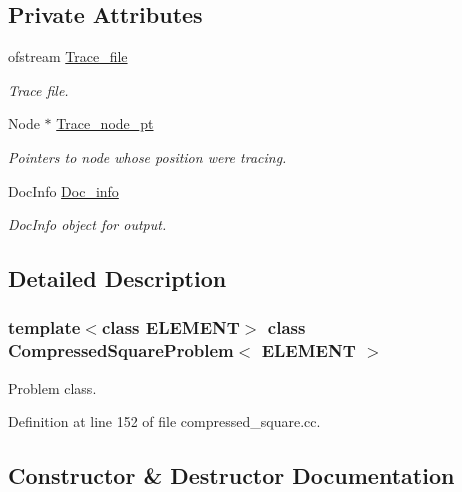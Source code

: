 \subsection*{Private Attributes}
\begin{DoxyCompactItemize}
\item 
ofstream \hyperlink{classCompressedSquareProblem_afc8bc8ff7811d18f8d59cd1c35e6cb00}{Trace\+\_\+file}
\begin{DoxyCompactList}\small\item\em Trace file. \end{DoxyCompactList}\item 
Node $\ast$ \hyperlink{classCompressedSquareProblem_a0af6b1044a8392a3ae3d753f4db52664}{Trace\+\_\+node\+\_\+pt}
\begin{DoxyCompactList}\small\item\em Pointers to node whose position we\textquotesingle{}re tracing. \end{DoxyCompactList}\item 
Doc\+Info \hyperlink{classCompressedSquareProblem_a2269691c7bef351c87a4421d275fe7c3}{Doc\+\_\+info}
\begin{DoxyCompactList}\small\item\em Doc\+Info object for output. \end{DoxyCompactList}\end{DoxyCompactItemize}


\subsection{Detailed Description}
\subsubsection*{template$<$class E\+L\+E\+M\+E\+NT$>$\newline
class Compressed\+Square\+Problem$<$ E\+L\+E\+M\+E\+N\+T $>$}

Problem class. 

Definition at line 152 of file compressed\+\_\+square.\+cc.



\subsection{Constructor \& Destructor Documentation}
\mbox{\label{classCompressedSquareProblem_af013df43f2a9f6ee8ff16cf59ddd9439}} 
